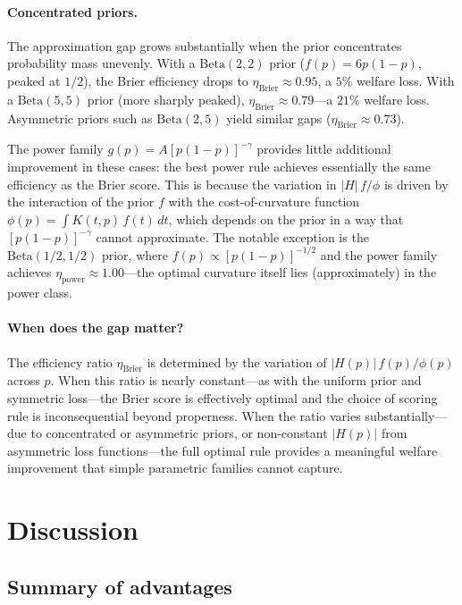 \documentclass[11pt]{article}
\begin{document}
\paragraph{Concentrated priors.} The approximation gap grows substantially when the prior concentrates probability mass unevenly. With a $\mathrm{Beta}(2,2)$ prior ($f(p) = 6p(1-p)$, peaked at $1/2$), the Brier efficiency drops to $\eta_{\mathrm{Brier}} \approx 0.95$, a $5\%$ welfare loss. With a $\mathrm{Beta}(5,5)$ prior (more sharply peaked), $\eta_{\mathrm{Brier}} \approx 0.79$---a $21\%$ welfare loss. Asymmetric priors such as $\mathrm{Beta}(2,5)$ yield similar gaps ($\eta_{\mathrm{Brier}} \approx 0.73$).

The power family $g(p) = A[p(1-p)]^{-\gamma}$ provides little additional improvement in these cases: the best power rule achieves essentially the same efficiency as the Brier score. This is because the variation in $|H|\,f/\phi$ is driven by the interaction of the prior $f$ with the cost-of-curvature function $\phi(p) = \int K(t,p)\,f(t)\,dt$, which depends on the prior in a way that $[p(1-p)]^{-\gamma}$ cannot approximate. The notable exception is the $\mathrm{Beta}(1/2,1/2)$ prior, where $f(p) \propto [p(1-p)]^{-1/2}$ and the power family achieves $\eta_{\mathrm{power}} \approx 1.00$---the optimal curvature itself lies (approximately) in the power class.

\paragraph{When does the gap matter?} The efficiency ratio $\eta_{\mathrm{Brier}}$ is determined by the variation of $|H(p)|\,f(p)/\phi(p)$ across $p$. When this ratio is nearly constant---as with the uniform prior and symmetric loss---the Brier score is effectively optimal and the choice of scoring rule is inconsequential beyond properness. When the ratio varies substantially---due to concentrated or asymmetric priors, or non-constant $|H(p)|$ from asymmetric loss functions---the full optimal rule provides a meaningful welfare improvement that simple parametric families cannot capture.


\section{Discussion}

\subsection{Summary of advantages}
\end{document}

